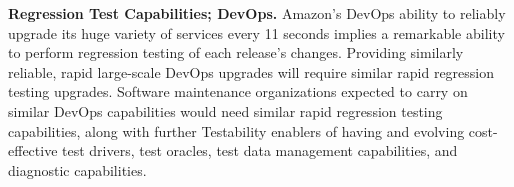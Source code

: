 \textbf {Regression Test Capabilities; DevOps.}
Amazon's DevOps ability to reliably upgrade its huge variety of services every 11 seconds implies a remarkable ability to perform regression testing of each release's changes.  Providing similarly reliable, rapid large-scale DevOps upgrades will require similar rapid regression testing upgrades.  Software maintenance organizations expected to carry on similar DevOps capabilities would need similar rapid regression testing capabilities, along with further Testability enablers of having and evolving cost-effective test drivers, test oracles, test data management capabilities, and diagnostic capabilities.   





